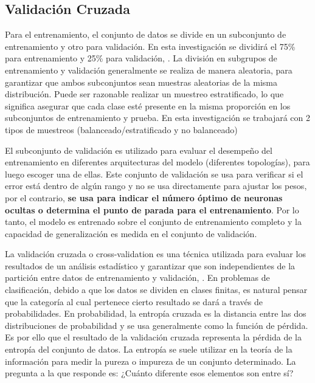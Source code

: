 	\subsection{Validación Cruzada}
	

		Para el entrenamiento, el conjunto de datos se divide en un subconjunto de entrenamiento y otro para validación. En esta investigación se dividirá el 75\% para entrenamiento y 25\% para validación, {\citep {Elkan12evaluatingclassifiers}}. La división en subgrupos de entrenamiento y validación generalmente se realiza de manera aleatoria, para garantizar que ambos subconjuntos sean muestras aleatorias de la misma distribución. Puede ser razonable realizar un muestreo estratificado, lo que significa asegurar que cada clase esté presente en la misma proporción en los subconjuntos de entrenamiento y prueba. En esta investigación se trabajará con 2 tipos de muestreos (balanceado/estratificado y no balanceado)

		El subconjunto de validación es utilizado para evaluar el desempeño del entrenamiento en diferentes arquitecturas del modelo (diferentes topologías), para luego escoger una de ellas. Este conjunto de validación se usa para verificar si el error está dentro de algún rango y no se usa directamente para ajustar los pesos, por el contrario, \textbf{se usa para indicar el número óptimo de neuronas ocultas o determina el punto de parada para el entrenamiento}.  Por lo tanto, el modelo es entrenado sobre el conjunto de entrenamiento completo y la capacidad de generalización es medida en el conjunto de validación. 

		La validación cruzada o cross-validation es una técnica utilizada para evaluar los resultados de un análisis estadístico y garantizar que son independientes de la partición entre datos de entrenamiento y validación, \citep{moore2001cross}. En problemas de clasificación, debido a que los datos se dividen en clases finitas, es natural pensar que la categoría al cual pertenece cierto resultado se dará a través de probabilidades. En probabilidad, la entropía cruzada es la distancia entre las dos distribuciones de probabilidad y se usa generalmente como la función de pérdida. Es por ello que el resultado de la validación cruzada representa la pérdida de la entropía del conjunto de datos. La entropía se suele utilizar en la teoría de la información para medir la pureza o impureza de un conjunto determinado. La pregunta a la que responde es: ¿Cuánto diferente esos elementos son entre sí? 

